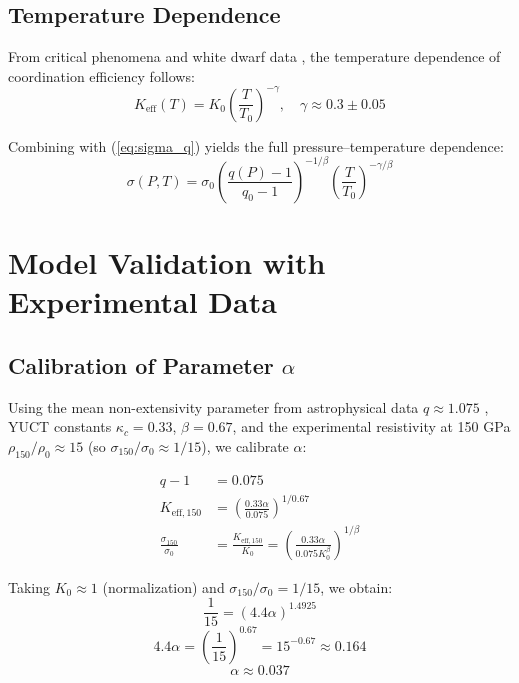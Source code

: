 \documentclass[12pt,a4paper]{article}
\theoremstyle{remark}
\newcommand{\Ke}{K_{\mathrm{eff}}}
\newcommand{\kappac}{\kappa_c}
\newcommand{\alp}{\alpha}
\begin{document}
	\subsection{Temperature Dependence}
	
	From critical phenomena and white dwarf data \cite{appendixP}, the temperature dependence of coordination efficiency follows:
	\begin{equation}
		\Ke(T) = K_0 \left( \frac{T}{T_0} \right)^{-\gamma}, \quad \gamma \approx 0.3 \pm 0.05
		\label{eq:keff_temp}
	\end{equation}
	
	Combining with (\ref{eq:sigma_q}) yields the full pressure–temperature dependence:
	\begin{equation}
		\sigma(P,T) = \sigma_0 \left( \frac{q(P)-1}{q_0-1} \right)^{-1/\beta} \left( \frac{T}{T_0} \right)^{-\gamma/\beta}
		\label{eq:sigma_PT}
	\end{equation}
	
	\section{Model Validation with Experimental Data}
	
	\subsection{Calibration of Parameter \(\alp\)}
	
	Using the mean non-extensivity parameter from astrophysical data \(q \approx 1.075\) \cite{bertulani2015}, YUCT constants \(\kappac = 0.33\), \(\beta = 0.67\), and the experimental resistivity at 150 GPa \(\rho_{150}/\rho_0 \approx 15\) (so \(\sigma_{150}/\sigma_0 \approx 1/15\)), we calibrate \(\alp\):
	
	\begin{align}
		q - 1 &= 0.075 \nonumber \\
		K_{\mathrm{eff},150} &= \left( \frac{0.33 \alp}{0.075} \right)^{1/0.67} \nonumber \\
		\frac{\sigma_{150}}{\sigma_0} &= \frac{K_{\mathrm{eff},150}}{K_0} = \left( \frac{0.33 \alp}{0.075 K_0^{\beta}} \right)^{1/\beta} \label{eq:calibration}
	\end{align}
	
	Taking \(K_0 \approx 1\) (normalization) and \(\sigma_{150}/\sigma_0 = 1/15\), we obtain:
	\[
	\frac{1}{15} = \left( 4.4 \alp \right)^{1.4925}
	\]
	\[
	4.4 \alp = \left( \frac{1}{15} \right)^{0.67} = 15^{-0.67} \approx 0.164
	\]
	\[
	\alp \approx 0.037
	\]
	
\end{document}
